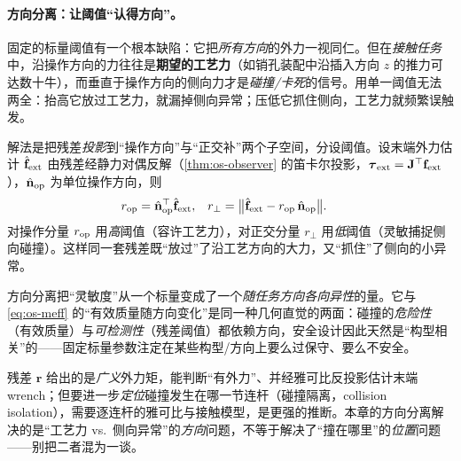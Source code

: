 \paragraph{方向分离：让阈值“认得方向”。}
固定的标量阈值有一个根本缺陷：它把\emph{所有方向}的外力一视同仁。但在\emph{接触任务}中，沿操作方向的力往往是\textbf{期望的工艺力}（如销孔装配中沿插入方向 $z$ 的推力可达数十牛），而垂直于操作方向的侧向力才是\emph{碰撞/卡死}的信号。用单一阈值无法两全：抬高它放过工艺力，就漏掉侧向异常；压低它抓住侧向，工艺力就频繁误触发。

解法是把残差\emph{投影}到“操作方向”与“正交补”两个子空间，分设阈值。设末端外力估计 $\hat{\mathbf f}_{\rm ext}$ 由残差经静力对偶反解（\cref{thm:os-observer} 的笛卡尔投影，$\boldsymbol\tau_{\rm ext}=\mathbf J^\top\mathbf f_{\rm ext}$），$\hat{\mathbf n}_{\rm op}$ 为单位操作方向，则
\begin{align}
  r_{\rm op}&=\hat{\mathbf n}_{\rm op}^\top\hat{\mathbf f}_{\rm ext}, &
  r_\perp&=\bigl\|\hat{\mathbf f}_{\rm ext}-r_{\rm op}\,\hat{\mathbf n}_{\rm op}\bigr\|.
  \label{eq:cs-dirsplit}
\end{align}
对操作分量 $r_{\rm op}$ 用\emph{高}阈值（容许工艺力），对正交分量 $r_\perp$ 用\emph{低}阈值（灵敏捕捉侧向碰撞）。这样同一套残差既“放过”了沿工艺方向的大力，又“抓住”了侧向的小异常。

\begin{insight}
方向分离把“灵敏度”从一个标量变成了一个\emph{随任务方向各向异性}的量。它与 \cref{eq:os-meff} 的“有效质量随方向变化”是同一种几何直觉的两面：碰撞的\emph{危险性}（有效质量）与\emph{可检测性}（残差阈值）都依赖方向，安全设计因此天然是“构型相关”的——固定标量参数注定在某些构型/方向上要么过保守、要么不安全。
\end{insight}

\begin{pitfall}
残差 $\mathbf r$ 给出的是\emph{广义}外力矩，能判断“有外力”、并经雅可比反投影估计末端 wrench；但要进一步\emph{定位}碰撞发生在哪一节连杆（碰撞隔离，collision isolation），需要逐连杆的雅可比与接触模型，是更强的推断。本章的方向分离解决的是“工艺力 vs.\ 侧向异常”的\emph{方向}问题，不等于解决了“撞在哪里”的\emph{位置}问题——别把二者混为一谈。
\end{pitfall}

